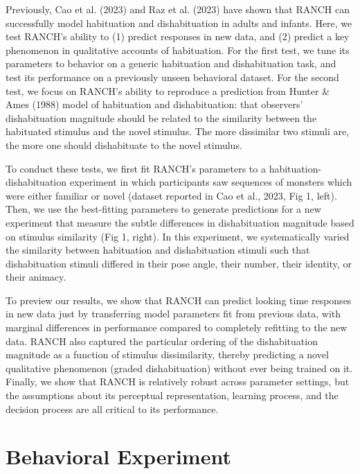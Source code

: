 \documentclass[10pt, letterpaper]{article}
\begin{document}
Previously, Cao et al. (2023) and Raz et al. (2023) have shown that
RANCH can successfully model habituation and dishabituation in adults
and infants. Here, we test RANCH's ability to (1) predict responses in
new data, and (2) predict a key phenomenon in qualitative accounts of
habituation. For the first test, we tune its parameters to behavior on a
generic habituation and dishabituation task, and test its performance on
a previously unseen behavioral dataset. For the second test, we focus on
RANCH's ability to reproduce a prediction from Hunter \& Ames (1988)
model of habituation and dishabituation: that observers' dishabituation
magnitude should be related to the similarity between the habituated
stimulus and the novel stimulus. The more dissimilar two stimuli are,
the more one should dishabituate to the novel stimulus.

To conduct these tests, we first fit RANCH's parameters to a
habituation-dishabituation experiment in which participants saw
sequences of monsters which were either familiar or novel (dataset
reported in Cao et al., 2023, Fig 1, left). Then, we use the
best-fitting parameters to generate predictions for a new experiment
that measure the subtle differences in dishabituation magnitude based on
stimulus similarity (Fig 1, right). In this experiment, we
systematically varied the similarity between habituation and
dishabituation stimuli such that dishabituation stimuli differed in
their pose angle, their number, their identity, or their animacy.

To preview our results, we show that RANCH can predict looking time
responses in new data just by transferring model parameters fit from
previous data, with marginal differences in performance compared to
completely refitting to the new data. RANCH also captured the particular
ordering of the dishabituation magnitude as a function of stimulus
dissimilarity, thereby predicting a novel qualitative phenomenon (graded
dishabituation) without ever being trained on it. Finally, we show that
RANCH is relatively robust across parameter settings, but the
assumptions about its perceptual representation, learning process, and
the decision process are all critical to its performance.

\hypertarget{behavioral-experiment}{%
\section{Behavioral Experiment}\label{behavioral-experiment}}
\end{document}

